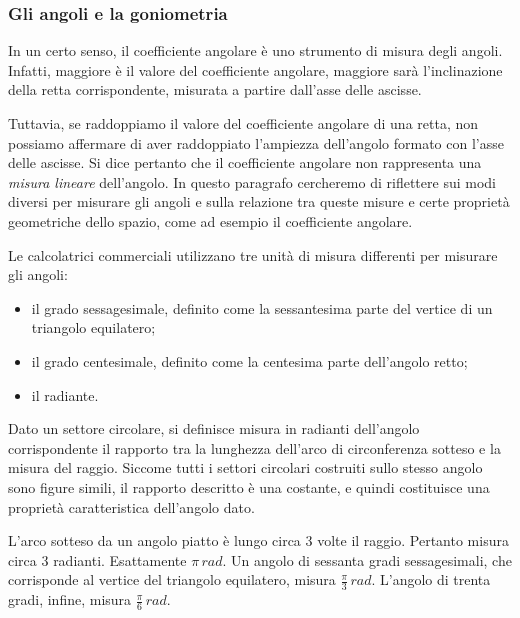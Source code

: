 \subsubsection*{Gli angoli e la goniometria}

In un certo senso, il coefficiente angolare è uno strumento di misura degli angoli.\newline
Infatti, maggiore è il valore del coefficiente angolare, maggiore sarà l'inclinazione della retta corrispondente, misurata a partire dall'asse delle ascisse.
\newline

Tuttavia, se raddoppiamo il valore del coefficiente angolare di una retta, non possiamo affermare di aver raddoppiato l'ampiezza dell'angolo formato con l'asse delle ascisse. Si dice pertanto che il coefficiente angolare non rappresenta una {\slshape misura lineare} dell'angolo.\newline
In questo paragrafo cercheremo di riflettere sui modi diversi per misurare gli angoli e sulla relazione tra queste misure e certe proprietà geometriche dello spazio, come ad esempio il coefficiente angolare.

Le calcolatrici commerciali utilizzano tre unità di misura differenti per misurare gli angoli:
\begin{itemize}
\item il grado sessagesimale, definito come la sessantesima parte del vertice di un triangolo equilatero;
\item il grado centesimale, definito come la centesima parte dell'angolo retto;
\item il radiante.
\end{itemize}

Dato un settore circolare, si definisce misura in radianti dell'angolo corrispondente il rapporto tra la lunghezza dell'arco di circonferenza sotteso e la misura del raggio. Siccome tutti i settori circolari costruiti sullo stesso angolo sono figure simili, il rapporto descritto è una costante, e quindi costituisce una proprietà caratteristica dell'angolo dato.
\newline

L'arco sotteso da un angolo piatto è lungo circa 3 volte il raggio. Pertanto misura circa 3 radianti. Esattamente $\pi\, rad$.\newline
Un angolo di sessanta gradi sessagesimali, che corrisponde al vertice del triangolo equilatero, misura $\frac \pi 3\, rad$.\newline
L'angolo di trenta gradi, infine, misura $\frac \pi 6\, rad$.
\newline

